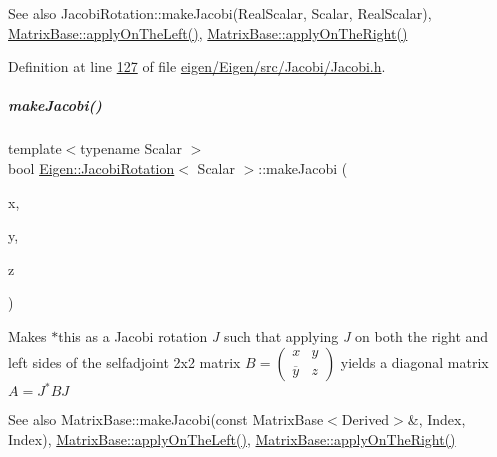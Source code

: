 \begin{DoxySeeAlso}{See also}
Jacobi\+Rotation\+::make\+Jacobi(\+Real\+Scalar, Scalar, Real\+Scalar), \hyperlink{group___core___module_a3a08ad41e81d8ad4a37b5d5c7490e765}{Matrix\+Base\+::apply\+On\+The\+Left()}, \hyperlink{group___core___module_a45d91752925d2757fc8058a293b15462}{Matrix\+Base\+::apply\+On\+The\+Right()} 
\end{DoxySeeAlso}


Definition at line \hyperlink{eigen_2_eigen_2src_2_jacobi_2_jacobi_8h_source_l00127}{127} of file \hyperlink{eigen_2_eigen_2src_2_jacobi_2_jacobi_8h_source}{eigen/\+Eigen/src/\+Jacobi/\+Jacobi.\+h}.

\mbox{\label{group___jacobi___module_a6572f272cac38e070a99b466dd1fbc74}} 
\subparagraph{\texorpdfstring{make\+Jacobi()}{makeJacobi()}\hspace{0.1cm}{\footnotesize\ttfamily [2/2]}}
{\footnotesize\ttfamily template$<$typename Scalar $>$ \\
bool \hyperlink{group___jacobi___module_class_eigen_1_1_jacobi_rotation}{Eigen\+::\+Jacobi\+Rotation}$<$ Scalar $>$\+::make\+Jacobi (\begin{DoxyParamCaption}\item[{const Real\+Scalar \&}]{x,  }\item[{const Scalar \&}]{y,  }\item[{const Real\+Scalar \&}]{z }\end{DoxyParamCaption})}

Makes {\ttfamily $\ast$this} as a Jacobi rotation {\itshape J} such that applying {\itshape J} on both the right and left sides of the selfadjoint 2x2 matrix $ B = \left ( \begin{array}{cc} x & y \\ \overline y & z \end{array} \right )$ yields a diagonal matrix $ A = J^* B J $

\begin{DoxySeeAlso}{See also}
Matrix\+Base\+::make\+Jacobi(const Matrix\+Base$<$\+Derived$>$\&, Index, Index), \hyperlink{group___core___module_a3a08ad41e81d8ad4a37b5d5c7490e765}{Matrix\+Base\+::apply\+On\+The\+Left()}, \hyperlink{group___core___module_a45d91752925d2757fc8058a293b15462}{Matrix\+Base\+::apply\+On\+The\+Right()} 
\end{DoxySeeAlso}


